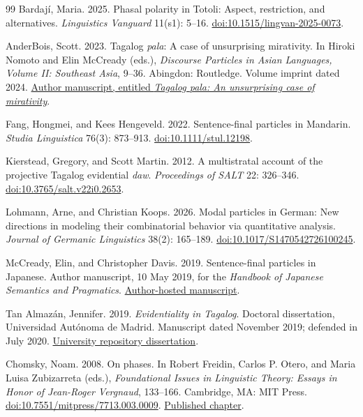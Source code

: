 \begin{thebibliography}{99}
Bardaj\'{i}, Maria. 2025.
Phasal polarity in Totoli: Aspect, restriction, and alternatives.
\textit{Linguistics Vanguard} 11(s1): 5--16.
\href{https://doi.org/10.1515/lingvan-2025-0073}{doi:10.1515/lingvan-2025-0073}.

AnderBois, Scott. 2023.
Tagalog \textit{pala}: A case of unsurprising mirativity.
In Hiroki Nomoto and Elin McCready (eds.),
\textit{Discourse Particles in Asian Languages, Volume II: Southeast Asia}, 9--36.
Abingdon: Routledge. Volume imprint dated 2024.
\href{https://anderbois.github.io/PDFs/AnderBois_Tagalog_pala.pdf}{Author manuscript,
entitled \textit{Tagalog pala: An unsurprising case of mirativity}}.

Fang, Hongmei, and Kees Hengeveld. 2022.
Sentence-final particles in Mandarin.
\textit{Studia Linguistica} 76(3): 873--913.
\href{https://doi.org/10.1111/stul.12198}{doi:10.1111/stul.12198}.

Kierstead, Gregory, and Scott Martin. 2012.
A multistratal account of the projective Tagalog evidential \textit{daw}.
\textit{Proceedings of SALT} 22: 326--346.
\href{https://doi.org/10.3765/salt.v22i0.2653}{doi:10.3765/salt.v22i0.2653}.

Lohmann, Arne, and Christian Koops. 2026.
Modal particles in German: New directions in modeling their combinatorial
behavior via quantitative analysis.
\textit{Journal of Germanic Linguistics} 38(2): 165--189.
\href{https://doi.org/10.1017/S1470542726100245}{doi:10.1017/S1470542726100245}.

McCready, Elin, and Christopher Davis. 2019.
Sentence-final particles in Japanese.
Author manuscript, 10 May 2019, for the \textit{Handbook of Japanese Semantics
and Pragmatics}.
\href{https://cmdavis.org/publications/McCready-Davis-2020-HandbookJapaneseSemantics-preprint.pdf}{Author-hosted manuscript}.

Tan Almaz\'{a}n, Jennifer. 2019.
\textit{Evidentiality in Tagalog}.
Doctoral dissertation, Universidad Aut\'{o}noma de Madrid.
Manuscript dated November 2019; defended in July 2020.
\href{https://repositorio.uam.es/bitstream/10486/692396/1/tan_almazan_jennifer.pdf}{University repository dissertation}.


Chomsky, Noam. 2008.
On phases.
In Robert Freidin, Carlos P. Otero, and Maria Luisa Zubizarreta (eds.),
\textit{Foundational Issues in Linguistic Theory: Essays in Honor of
Jean-Roger Vergnaud}, 133--166.
Cambridge, MA: MIT Press.
\href{https://doi.org/10.7551/mitpress/7713.003.0009}{doi:10.7551/mitpress/7713.003.0009}.
\href{https://www.its.caltech.edu/~matilde/ChomskyOnPhases.pdf}{Published chapter}.


\end{thebibliography}
